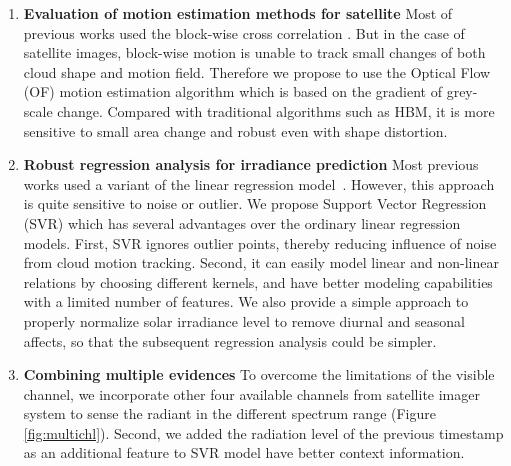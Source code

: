 \documentclass[conference]{IEEEtran}
\begin{document}
\begin{enumerate}%
\item \textbf{Evaluation of motion estimation methods for satellite} 
Most of previous works used the block-wise cross correlation \cite{cote1995neural,leese1970determination}. But in the case of satellite images,
block-wise motion is unable to track small changes of both cloud shape and motion
field. Therefore we propose to use the Optical Flow (OF) 
motion estimation algorithm which is based on the gradient of grey-scale change.
Compared with traditional algorithms such as HBM, it is more sensitive to small 
area change and robust even with shape distortion.


\item \textbf{Robust regression analysis for irradiance prediction} 
Most previous works used a variant of the linear regression
model~\cite{perez2002new}.
However, this approach is quite sensitive to noise or outlier. We propose Support 
Vector Regression (SVR) which has several advantages over the ordinary linear regression models. 
First, SVR ignores outlier points, thereby reducing influence of noise from
cloud motion tracking. Second, it can easily model linear and non-linear
relations by choosing different kernels, and have better modeling capabilities with a limited number
of features. We also provide a simple approach to properly normalize solar
irradiance level to remove diurnal  and seasonal affects, so that the subsequent
regression analysis could be simpler.  

\item \textbf{Combining multiple evidences}  
To overcome the limitations of the visible channel, we incorporate other four
available channels from satellite imager system to sense the radiant in the
different spectrum range (Figure \ref{fig:multichl}). Second, we added the
radiation level of the previous timestamp as an additional feature to SVR 
model have better context information.


\end{enumerate}
\end{document}
